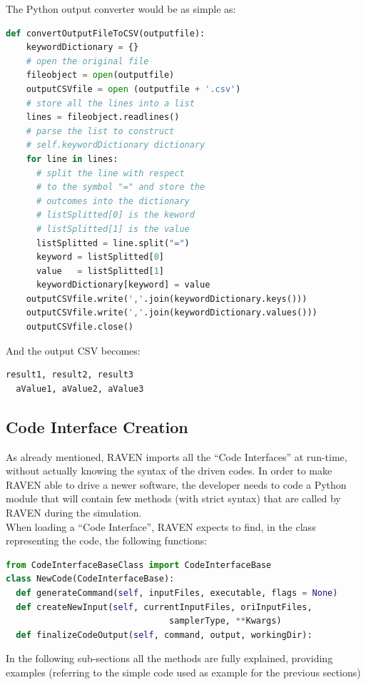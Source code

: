 The Python output converter would be as simple as:
\begin{lstlisting}[language=python]
def convertOutputFileToCSV(outputfile):
    keywordDictionary = {}
    # open the original file
    fileobject = open(outputfile)
    outputCSVfile = open (outputfile + '.csv')
    # store all the lines into a list
    lines = fileobject.readlines()
    # parse the list to construct 
    # self.keywordDictionary dictionary
    for line in lines:
      # split the line with respect
      # to the symbol "=" and store the
      # outcomes into the dictionary
      # listSplitted[0] is the keword
      # listSplitted[1] is the value
      listSplitted = line.split("=")
      keyword = listSplitted[0]
      value   = listSplitted[1]
      keywordDictionary[keyword] = value
    outputCSVfile.write(','.join(keywordDictionary.keys()))
    outputCSVfile.write(','.join(keywordDictionary.values()))
    outputCSVfile.close()
\end{lstlisting} 
And the output CSV becomes:
\begin{lstlisting}[language=python]
  result1, result2, result3
  aValue1, aValue2, aValue3 
\end{lstlisting} 
\subsection{Code Interface Creation} 
\label{subsec:codeinterfacecreation}
As already mentioned, RAVEN imports all the ``Code Interfaces'' at run-time, 
without actually knowing the syntax of the driven codes. In order to make RAVEN
able to drive a newer software, the developer needs to code a Python module 
that will contain few methods (with strict syntax) that are called by RAVEN during the simulation.
\\ When loading a ``Code Interface'', RAVEN expects to find, in the class representing the code,
 the following functions:
\begin{lstlisting}[language=python]
from CodeInterfaceBaseClass import CodeInterfaceBase
class NewCode(CodeInterfaceBase):
  def generateCommand(self, inputFiles, executable, flags = None)
  def createNewInput(self, currentInputFiles, oriInputFiles,
                                samplerType, **Kwargs)                           
  def finalizeCodeOutput(self, command, output, workingDir):
\end{lstlisting} 
In the following sub-sections all the methods are fully explained, providing examples
 (referring to the simple code used as example for the previous sections)

